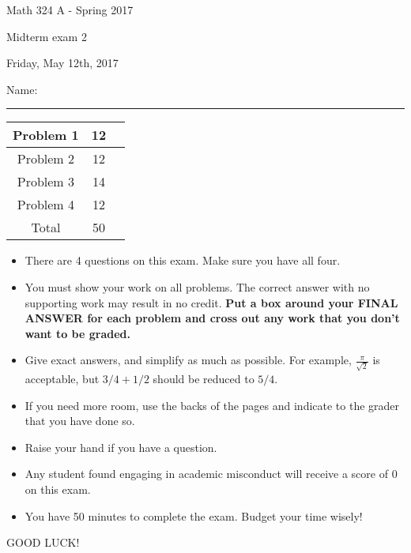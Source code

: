 \documentclass[12 pt]{report}
\begin{document}
\noindent \vfill \noindent \large

\centerline{Math 324 A  - Spring 2017}

\centerline{Midterm exam 2}

\centerline{Friday, May 12th, 2017}

\normalsize

\vfill
\medskip
Name: \rule{10cm}{1pt}

\bigskip

\vfill
\begin{center}
{\large
\begin{tabular}{||c|c|r||}
\hline Problem 1 & 12 & \hspace{10mm} \hfill \\
\hline Problem 2 & 12  & \hspace{10mm} \hfill \\
\hline Problem 3 & 14 & \hspace{10mm} \hfill \\
\hline Problem 4 & 12  & \hspace{10mm} \hfill \\
\hline Total & 50 & \hspace{10mm} \hfill \\
\hline
\end{tabular}
}
\end{center}
\vfill
\begin{itemize}
\item There are 4 questions on this exam. Make sure you have all four.
\item You must show your work on all problems.  The correct answer
with no supporting work may result in no credit. \textbf{Put a box
around your FINAL ANSWER for each problem and cross out any work
that you don't want to be graded.} 
\item Give exact answers, and simplify as much as possible. 
For example, $\frac{\pi}{\sqrt{2}}$ is acceptable, but $3/4 + 1/2$
should be reduced to $5/4$.   

\item If you need more room, use the backs
of the pages and indicate to the grader that you have done so.
\item Raise your hand if you have a question.
\item Any student found engaging in academic misconduct will receive
a score of 0 on this exam.
\item You have 50 minutes to complete the exam.  Budget your time wisely! \\
\end{itemize}
\vfill
\begin{center}GOOD LUCK!\end{center}
\end{document}
